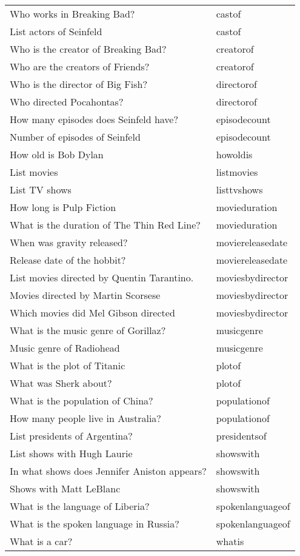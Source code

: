 \begin{longtable}{l l}
Who works in Breaking Bad? & castof\\
List actors of Seinfeld & castof\\
Who is the creator of Breaking Bad? & creatorof\\
Who are the creators of Friends? & creatorof\\
Who is the director of Big Fish? & directorof\\
Who directed Pocahontas? & directorof\\
How many episodes does Seinfeld have? & episodecount\\
Number of episodes of Seinfeld & episodecount\\
How old is Bob Dylan & howoldis\\
List movies & listmovies\\
List TV shows & listtvshows\\
How long is Pulp Fiction & movieduration\\
What is the duration of The Thin Red Line? & movieduration\\
When was gravity released? & moviereleasedate\\
Release date of the hobbit? & moviereleasedate\\
List movies directed by Quentin Tarantino. & moviesbydirector\\
Movies directed by Martin Scorsese & moviesbydirector\\
Which movies did Mel Gibson directed & moviesbydirector\\
What is the music genre of Gorillaz? & musicgenre\\
Music genre of Radiohead & musicgenre\\
What is the plot of Titanic & plotof\\
What was Sherk about? & plotof\\
What is the population of China? & populationof\\
How many people live in Australia? & populationof\\
List presidents of Argentina? & presidentsof\\
List shows with Hugh Laurie & showswith\\
In what shows does Jennifer Aniston appears? & showswith\\
Shows with Matt LeBlanc & showswith\\
What is the language of Liberia? & spokenlanguageof\\
What is the spoken language in Russia? & spokenlanguageof\\
What is a car? & whatis\\

\end{longtable}
